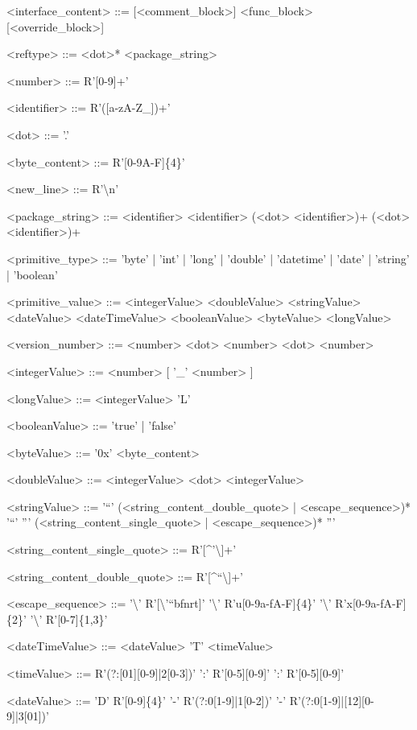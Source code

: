 \documentclass[./einleitung.tex]{subfiles}
\begin{document}
\begin{grammar}
<interface_content> ::= [<comment_block>] <func_block> [<override_block>]

<reftype> ::= <dot>* <package_string>

<number> ::= R'[0-9]+'

<identifier> ::= R'([a-zA-Z\_])+'

<dot> ::= '.'

<byte_content> ::= R'[0-9A-F]\{4\}'

<new_line> ::= R'\textbackslash n'

<package_string> ::= <identifier>
\alt <identifier> (<dot> <identifier>)+
\alt (<dot> <identifier>)+

<primitive_type> ::= 'byte' | 'int' | 'long' | 'double' | 'datetime' | 'date' | 'string' | 'boolean'

<primitive_value> ::= <integerValue> \alt <doubleValue> \alt <stringValue> \alt <dateValue> \alt <dateTimeValue> \alt <booleanValue> \alt <byteValue> \alt <longValue>

<version_number> ::= <number> <dot> <number> <dot> <number>

<integerValue> ::= <number> [ '_' <number> ]

<longValue> ::= <integerValue> 'L'

<booleanValue> ::= 'true' | 'false'

<byteValue> ::= '0x' <byte_content>

<doubleValue> ::= <integerValue> <dot> <integerValue>

<stringValue> ::= '\textquotedblleft' (<string_content_double_quote> | <escape_sequence>)* '\textquotedblleft'
    \alt ''' (<string_content_single_quote> | <escape_sequence>)* '''

<string_content_single_quote> ::= R'[\textasciicircum'\textbackslash]+'

<string_content_double_quote> ::= R'[\textasciicircum\textquotedblleft\textbackslash]+'

<escape_sequence> ::= '\textbackslash' R'[\textbackslash'\textquotedblleft bfnrt]'
    \alt  '\textbackslash' R'u[0-9a-fA-F]\{4\}'
    \alt  '\textbackslash' R'x[0-9a-fA-F]\{2\}'
    \alt  '\textbackslash' R'[0-7]\{1,3\}'

<dateTimeValue> ::= <dateValue> 'T' <timeValue>

<timeValue> ::= R'(?:[01][0-9]|2[0-3])' ':' R'[0-5][0-9]' ':' R'[0-5][0-9]'

<dateValue> ::= 'D' R'[0-9]\{4\}' '-' R'(?:0[1-9]|1[0-2])' '-' R'(?:0[1-9]|[12][0-9]|3[01])'
\end{grammar}
\end{document}

